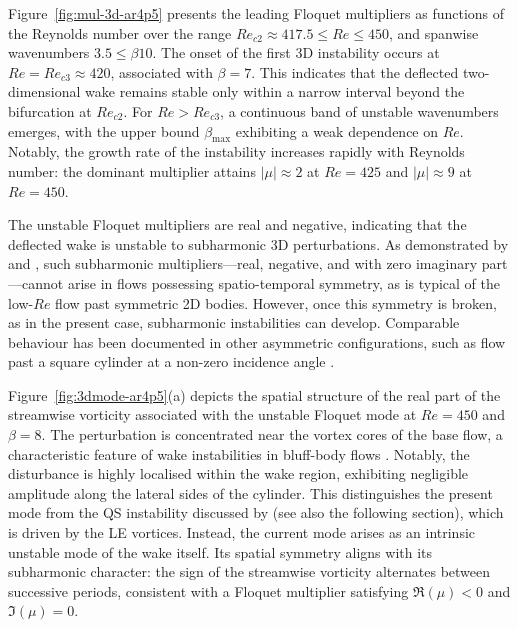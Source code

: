 Figure~\ref{fig:mul-3d-ar4p5} presents the leading Floquet multipliers as functions of the Reynolds number over the range $Re_{c2} \approx 417.5 \le Re \le 450$, and spanwise wavenumbers $3.5 \le \beta 10$. The onset of the first 3D instability occurs at $Re = Re_{c3} \approx 420$, associated with $\beta=7$. This indicates that the deflected two-dimensional wake remains stable only within a narrow interval beyond the bifurcation at $Re_{c2}$. For $Re>Re_{c3}$, a continuous band of unstable wavenumbers emerges, with the upper bound $\beta_{\max}$ exhibiting a weak dependence on $Re$. Notably, the growth rate of the instability increases rapidly with Reynolds number: the dominant multiplier attains $|\mu| \approx 2$ at $Re=425$ and $|\mu| \approx 9$ at $Re=450$.

The unstable Floquet multipliers are real and negative, indicating that the deflected wake is unstable to subharmonic 3D perturbations. As demonstrated by \cite{marques-lopez-blackburn-2004} and \cite{blackburn-etal-2005}, such subharmonic multipliers---real, negative, and with zero imaginary part---cannot arise in flows possessing spatio-temporal symmetry, as is typical of the low-$Re$ flow past symmetric 2D bodies. However, once this symmetry is broken, as in the present case, subharmonic instabilities can develop. Comparable behaviour has been documented in other asymmetric configurations, such as flow past a square cylinder at a non-zero incidence angle \citep{blackburn-sheard-2010}.

Figure~\ref{fig:3dmode-ar4p5}(a) depicts the spatial structure of the real part of the streamwise vorticity associated with the unstable Floquet mode at $Re=450$ and $\beta=8$. The perturbation is concentrated near the vortex cores of the base flow, a characteristic feature of wake instabilities in bluff-body flows \citep[e.g.,][]{thompson-leweke-williamson-2001, chaurasia-thompson-2011}. Notably, the disturbance is highly localised within the wake region, exhibiting negligible amplitude along the lateral sides of the cylinder. This distinguishes the present mode from the QS instability discussed by \cite{chiarini-quadrio-auteri-2022d} (see also the following section), which is driven by the LE vortices. Instead, the current mode arises as an intrinsic unstable mode of the wake itself. Its spatial symmetry aligns with its subharmonic character: the sign of the streamwise vorticity alternates between successive periods, consistent with a Floquet multiplier satisfying $\Re(\mu)<0$ and $\Im(\mu)=0$.

